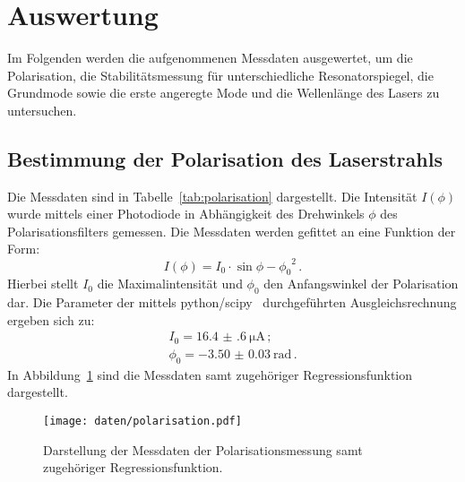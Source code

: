 \section{Auswertung}
\label{sec:Auswertung}
Im Folgenden werden die aufgenommenen Messdaten ausgewertet, um die Polarisation, die Stabilitätsmessung für unterschiedliche Resonatorspiegel, die Grundmode sowie die erste angeregte Mode und die Wellenlänge des Lasers
zu untersuchen.
\subsection{Bestimmung der Polarisation des Laserstrahls}
Die Messdaten sind in Tabelle~\ref{tab:polarisation} dargestellt. Die Intensität $I(\phi)$ wurde mittels einer Photodiode in Abhängigkeit des Drehwinkels $\phi$ des Polarisationsfilters gemessen.
Die Messdaten werden gefittet an eine Funktion der Form:
\begin{equation}
    I(\phi)=I_0\cdot \sin{\phi-\phi_0}^2 \,\text{.}
\end{equation}
Hierbei stellt $I_0$ die Maximalintensität und $\phi_0$ den Anfangswinkel der Polarisation dar.
Die Parameter der mittels python/scipy~\cite{scipy} durchgeführten Ausgleichsrechnung ergeben sich zu:
\begin{align}
  I_0=\SI{16.4(6)}{\micro\ampere}\,\text {;}\\ \phi_0=\SI{-3.50(3)}{\radian}\,\text{.}
\end{align}
In Abbildung~\ref{fig:polarisation} sind die Messdaten samt zugehöriger Regressionsfunktion dargestellt.
\begin{figure}
  \centering
  \texttt{[image: daten/polarisation.pdf]}
  \caption{Darstellung der Messdaten der Polarisationsmessung samt zugehöriger Regressionsfunktion.}
  \label{fig:polarisation}
\end{figure}

